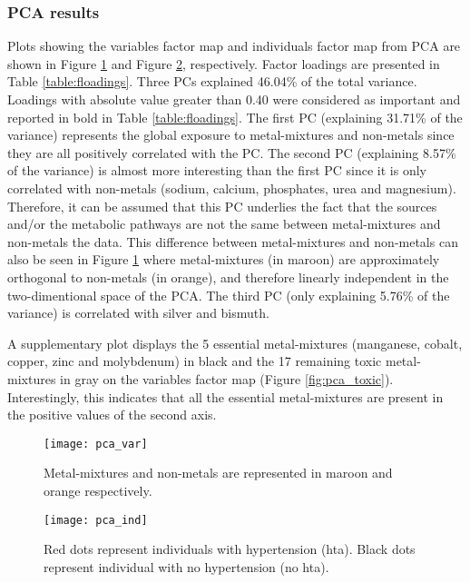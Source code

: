 \subsubsection{PCA results}
Plots showing the variables factor map and individuals factor map from PCA are shown in Figure \ref{fig:pca_var} and Figure \ref{fig:pca_ind}, respectively. Factor loadings are presented in Table \ref{table:floadings}. Three PCs explained 46.04\% of the total variance. Loadings with absolute value greater than 0.40 were considered as important and reported in bold in Table \ref{table:floadings}. The first PC (explaining 31.71\% of the variance) represents the global exposure to metal-mixtures and non-metals since they are all positively correlated with the PC. The second PC (explaining 8.57\% of the variance) is almost more interesting than the first PC since it is only correlated with non-metals (sodium, calcium, phosphates, urea and magnesium). Therefore, it can be assumed that this PC underlies the fact that the sources and/or the metabolic pathways are not the same between metal-mixtures and non-metals the data. This difference between metal-mixtures and non-metals can also be seen in Figure \ref{fig:pca_var} where metal-mixtures (in maroon) are approximately orthogonal to non-metals (in orange), and therefore linearly independent in the two-dimentional space of the PCA. The third PC (only explaining 5.76\% of the variance) is correlated with silver and bismuth.

A supplementary plot displays the 5 essential metal-mixtures (manganese, cobalt, copper, zinc and molybdenum) in black and the 17 remaining toxic metal-mixtures in gray on the variables factor map (Figure \ref{fig:pca_toxic}). Interestingly, this indicates that all the essential metal-mixtures are present in the positive values of the second axis.

\begin{figure}
\centering
\captionsetup{singlelinecheck = false, format= hang, justification=raggedright, font=small, labelsep=space}
\texttt{[image: pca\_var]}
  \label{fig:pca_var}
\begin{flushleft}
{\footnotesize Metal-mixtures and non-metals are represented in maroon and orange respectively.}
\end{flushleft}
\end{figure}

\begin{figure}
\centering
\captionsetup{singlelinecheck = false, format= hang, justification=raggedright, font=small, labelsep=space}
\texttt{[image: pca\_ind]}
  \label{fig:pca_ind}
\begin{flushleft}
{\footnotesize Red dots represent individuals with hypertension (hta). Black dots represent individual with no hypertension (no hta).}
\end{flushleft}
\end{figure}

